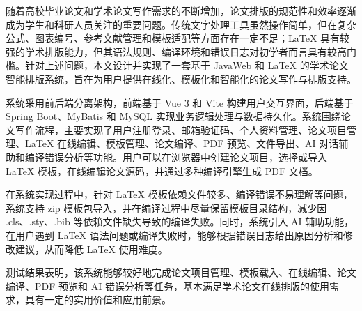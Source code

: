 随着高校毕业论文和学术论文写作需求的不断增加，论文排版的规范性和效率逐渐成为学生和科研人员关注的重要问题。传统文字处理工具虽然操作简单，但在复杂公式、图表编号、参考文献管理和模板适配等方面存在一定不足；LaTeX 具有较强的学术排版能力，但其语法规则、编译环境和错误日志对初学者而言具有较高门槛。针对上述问题，本文设计并实现了一套基于 JavaWeb 和 LaTeX 的学术论文智能排版系统，旨在为用户提供在线化、模板化和智能化的论文写作与排版支持。

系统采用前后端分离架构，前端基于 Vue 3 和 Vite 构建用户交互界面，后端基于 Spring Boot、MyBatis 和 MySQL 实现业务逻辑处理与数据持久化。系统围绕论文写作流程，主要实现了用户注册登录、邮箱验证码、个人资料管理、论文项目管理、LaTeX 在线编辑、模板管理、论文编译、PDF 预览、文件导出、AI 对话辅助和编译错误分析等功能。用户可以在浏览器中创建论文项目，选择或导入 LaTeX 模板，在线编辑论文源码，并通过多种编译引擎生成 PDF 文档。

在系统实现过程中，针对 LaTeX 模板依赖文件较多、编译错误不易理解等问题，系统支持 zip 模板包导入，并在编译过程中尽量保留模板目录结构，减少因 .cls、.sty、.bib 等依赖文件缺失导致的编译失败。同时，系统引入 AI 辅助功能，在用户遇到 LaTeX 语法问题或编译失败时，能够根据错误日志给出原因分析和修改建议，从而降低 LaTeX 使用难度。

测试结果表明，该系统能够较好地完成论文项目管理、模板载入、在线编辑、论文编译、PDF 预览和 AI 错误分析等任务，基本满足学术论文在线排版的使用需求，具有一定的实用价值和应用前景。
